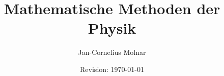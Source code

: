 \documentclass[a4paper,12pt,halfparskip,fleqn]{scrreprt}
\theoremstyle{plain}
\theoremstyle{marginbreak}
\theoremstyle{marginbreak}
\theoremstyle{margin}
\numberwithin{equation}{section}
\begin{document}

\renewcommand\thesection{\arabic{section}}

\title{Mathematische Methoden der Physik}
\author{Jan-Cornelius Molnar}
\date{Revision: \today}

\maketitle


\tableofcontents %

\newpage

\newpage

\newpage

\newpage

\newpage

\newpage

\newpage

\newpage

\newpage

\end{document}
